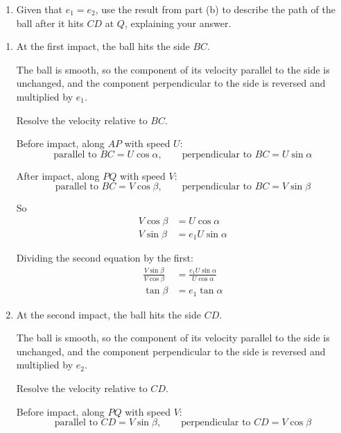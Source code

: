 \documentclass[leqno]{article}
\begin{document}
\begin{enumerate}[
  label=\textbf{\arabic*.},
  leftmargin=*,
  topsep=0pt,
  partopsep=0pt,
  parsep=0pt
]
\begin{enumerate}[label=\textbf{(\alph*)}, resume]
  \item Given that $e_1=e_2$, use the result from part (b) to describe the path of the ball after it hits $CD$ at $Q$, explaining your answer.  \\
\end{enumerate}

\vspace*{10pt}

\begin{djsSolution}
\begin{enumerate}[label=\textbf{(\alph*)}]
  \item At the first impact, the ball hits the side $BC$.

  The ball is smooth, so the component of its velocity parallel to the side is unchanged, and the component perpendicular to the side is reversed and multiplied by $e_1$.

  Resolve the velocity relative to $BC$.

  Before impact, along $AP$ with speed $U$:
  \[
  \text{parallel to }BC = U\cos\alpha, 
  \qquad
  \text{perpendicular to }BC = U\sin\alpha
  \]

  After impact, along $PQ$ with speed $V$:
  \[
  \text{parallel to }BC = V\cos\beta, 
  \qquad
  \text{perpendicular to }BC = V\sin\beta
  \]

  So
  \begin{align*}
  V\cos\beta &= U\cos\alpha \\
  V\sin\beta &= e_1U\sin\alpha
  \end{align*}

  Dividing the second equation by the first:
  \begin{align*}
  \frac{V\sin\beta}{V\cos\beta}
  &= \frac{e_1U\sin\alpha}{U\cos\alpha} \\
  \tan\beta &= e_1\tan\alpha
  \end{align*}


  \item At the second impact, the ball hits the side $CD$.

  The ball is smooth, so the component of its velocity parallel to the side is unchanged, and the component perpendicular to the side is reversed and multiplied by $e_2$.

  Resolve the velocity relative to $CD$.

  Before impact, along $PQ$ with speed $V$:
  \[
  \text{parallel to }CD = V\sin\beta, 
  \qquad
  \text{perpendicular to }CD = V\cos\beta
  \]


\end{enumerate}
\end{djsSolution}
\end{enumerate}
\end{document}
